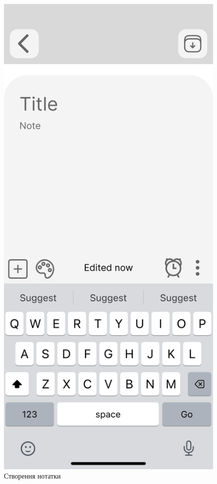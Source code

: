 \documentclass[oneside,14pt]{extarticle}
\begin{document}
\begin{normalsize}
\begin{figure}[H]
\begin{minipage}{0.48\textwidth}
		\end{minipage}\hfill
		\begin{minipage}{0.48\textwidth}
			\centering
			\includegraphics[scale=0.13]{Frame 6}
			\caption{Створення нотатки}
		\end{minipage}
	\end{figure}
	

\end{normalsize}
\end{document}
